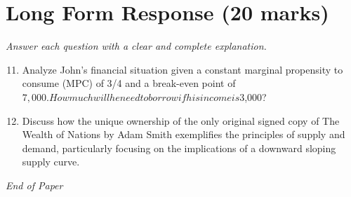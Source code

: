 \documentclass[12pt]{article}
\begin{document}
\section*{Long Form Response (20 marks)}
\textit{Answer each question with a clear and complete explanation.}
\begin{enumerate}[label=\arabic*.]
\setcounter{enumi}{10}
\item Analyze John's financial situation given a constant marginal propensity to consume (MPC) of 3/4 and a break-even point of $7,000. How much will he need to borrow if his income is $3,000?
\item Discuss how the unique ownership of the only original signed copy of The Wealth of Nations by Adam Smith exemplifies the principles of supply and demand, particularly focusing on the implications of a downward sloping supply curve.
\end{enumerate}

\vfill
\noindent\textit{End of Paper}
\end{document}

